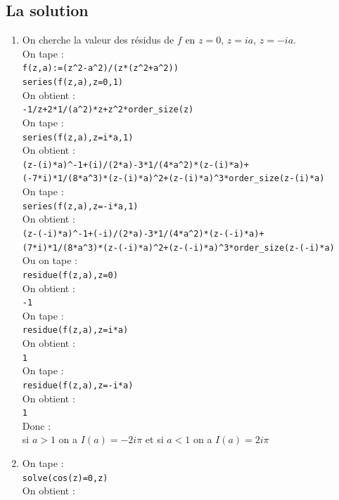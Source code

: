 \documentclass[a4paper,11pt]{book}
\begin{document}
\subsection{La solution}
\begin{enumerate}
\item On cherche la valeur des r\'esidus de $f$ en $z=0$, $z=ia$, $z=-ia$.\\
On tape :\\
{\tt f(z,a):=(z\verb|^|2-a\verb|^|2)/(z*(z\verb|^|2+a\verb|^|2))}\\
{\tt series(f(z,a),z=0,1)}\\
On obtient :\\
{\tt -1/z+2*1/(a\verb|^|2)*z+z\verb|^|2*order\_size(z)}\\
On tape :\\
{\tt series(f(z,a),z=i*a,1)}\\
On obtient :\\
{\tt (z-(i)*a)\verb|^|-1+(i)/(2*a)-3*1/(4*a\verb|^|2)*(z-(i)*a)+\\
(-7*i)*1/(8*a\verb|^|3)*(z-(i)*a)\verb|^|2+(z-(i)*a)\verb|^|3*order\_size(z-(i)*a)}\\
On tape :\\
{\tt series(f(z,a),z=-i*a,1)}\\
On obtient :\\
{\tt (z-(-i)*a)\verb|^|-1+(-i)/(2*a)-3*1/(4*a\verb|^|2)*(z-(-i)*a)+\\
(7*i)*1/(8*a\verb|^|3)*(z-(-i)*a)\verb|^|2+(z-(-i)*a)\verb|^|3*order\_size(z-(-i)*a)}\\
Ou on tape :\\
{\tt residue(f(z,a),z=0)}\\
On obtient :\\
{\tt -1}\\
On tape :\\
{\tt residue(f(z,a),z=i*a)}\\
On obtient :\\
{\tt 1}\\
On tape :\\
{\tt residue(f(z,a),z=-i*a)}\\
On obtient :\\
{\tt 1}\\
Donc :\\
si $a>1$ on a $I(a)=-2i\pi$ et
si $a<1$ on a $I(a)=2i\pi$
\item On tape :\\
{\tt solve(cos(z)=0,z)}\\
On obtient :\\

\end{enumerate}
\end{document}
